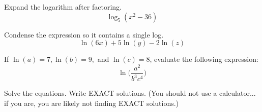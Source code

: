\documentclass[11pt,addpoints,answers]{exam}
\begin{document}
\begin{questions}
\begin{multicols}{2}
\question[10] Expand the logarithm after factoring.
\[\log_5 (x^2 - 36)\]
\vspace*{2in}
\begin{flushright}\end{flushright}
\end{multicols}

 \vfill
\pagestyle{empty}
\newpage


\begin{multicols}{2}
\question[10] Condense the expression so it contains a single log.
\[\ln(6x) + 5\ln(y) - 2\ln(z)\]
\vspace*{2in}
\begin{flushright}\end{flushright}
\columnbreak

\question[10] If $\ln(a) = 7, \ln(b) = 9,$ and $\ln(c)=8$, evaluate the following expression:
\[\ln \bigg(\dfrac{a^2}{b^3 c^4}\bigg)\]
\vspace*{2in}
\begin{flushright}\end{flushright}
\end{multicols}

\question Solve the equations.  Write EXACT solutions.  (You should not use a calculator... if you are, you are likely not finding EXACT solutions.)
\begin{multicols}{2}
\end{multicols}
\end{questions}
\end{document}

